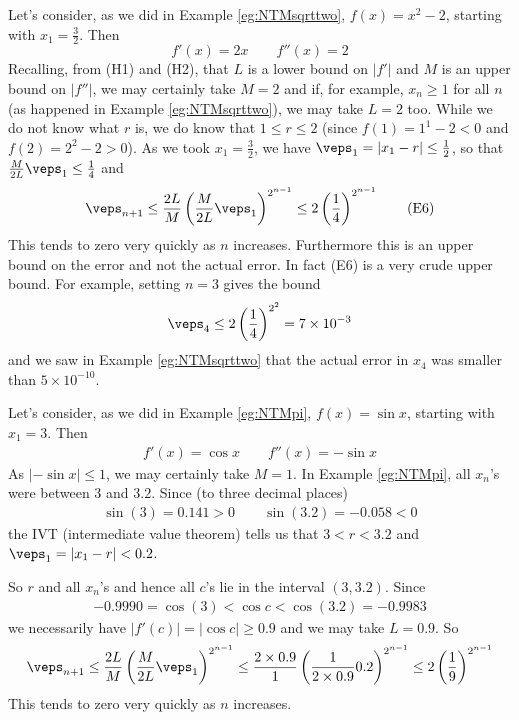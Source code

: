 \bigskip
\begin{eg}
\label{eg:NTMsqrttwoB} 
Let's consider, as we did in Example \ref{eg:NTMsqrttwo}, 
$f(x)=x^2-2$, starting with $x_1=\frac{3}{2}$. Then
\begin{equation*}
f'(x)=2x\qquad
f''(x)=2
\end{equation*}
Recalling, from (H1) and (H2), that $L$ is a lower bound on $|f'|$ and
$M$ is an upper bound on $|f''|$,
 we may certainly take $M=2$ and if, for example, $x_n\ge 1$ for all
$n$ (as happened in Example \ref{eg:NTMsqrttwo}), we may take $L=2$ too.
While we do not know what $r$ is, we do know that $1\le r\le 2$ 
(since $f(1)=1^1-2<0$ and $f(2)=2^2-2>0$). As we took $x_1=\frac{3}{2}$,
we have $\veps_1=|x_1-r|\le \frac{1}{2}$, so that 
$\frac{M}{2L}\veps_1\le\frac{1}{4}$ and
\begin{equation*}
\veps_{n+1}\le  \frac{2L}{M}\left(\frac{M}{2L}\veps_1\right)^{2^{n-1}}
\le 2\left(\frac{1}{4}\right)^{2^{n-1}}
\tag{E6}\end{equation*}
This tends to zero very quickly as $n$ increases. Furthermore this is an
upper bound on the error and not the actual error. In fact 
(E6) is a very crude upper bound. For example, setting $n=3$ gives the bound
\begin{equation*}
\veps_4\le 2\left(\frac{1}{4}\right)^{2^2} = 7\times 10^{-3}
\end{equation*}
and we saw in Example \ref{eg:NTMsqrttwo} that the actual error in $x_4$ 
was smaller than $5\times 10^{-10}$.

\end{eg}



\begin{eg}\label{eg:NTMpi}
Let's consider, as we did in Example \ref{eg:NTMpi}, $f(x)=\sin x$, 
starting with $x_1=3$. Then
\begin{align*}
f'(x)=\cos x\qquad
f''(x)=-\sin x
\end{align*}
As $|-\sin x|\le 1$, we may certainly take $M=1$. 
In Example \ref{eg:NTMpi}, all $x_n$'s were between $3$ and $3.2$. 
Since (to three decimal places)
\begin{align*}
\sin(3)=0.141>0\qquad
\sin(3.2)=-0.058<0
\end{align*}
the IVT (intermediate value theorem) tells us that $3<r<3.2$ and $\veps_1=|x_1-r|<0.2$. 

So $r$ and all $x_n$'s and hence all $c$'s
lie in the interval $(3,3.2)$.  Since
\begin{align*}
-0.9990=\cos(3)<\cos c < \cos(3.2) =- 0.9983
\end{align*}
we necessarily have $\big|f'(c)\big|=\big|\cos c\big|\ge 0.9$ and we may 
take $L=0.9$.  So
\begin{align*}
\veps_{n+1}\le  \frac{2L}{M}\left(\frac{M}{2L}\veps_1\right)^{2^{n-1}}
\le \frac{2\times0.9}{1}\left(\frac{1}{2\times0.9}0.2\right)^{2^{n-1}}
\le 2\left(\frac{1}{9}\right)^{2^{n-1}}
\end{align*}
This tends to zero very quickly as $n$ increases.
\end{eg}

